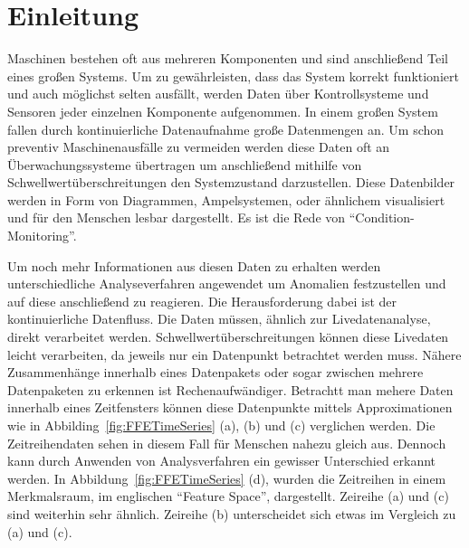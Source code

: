 \section{Einleitung}\label{kap:einleitung}


Maschinen bestehen oft aus mehreren Komponenten und sind anschließend Teil eines großen Systems.
Um zu gewährleisten, dass das System korrekt funktioniert und auch möglichst selten ausfällt, werden Daten über Kontrollsysteme und Sensoren jeder einzelnen Komponente aufgenommen.
In einem großen System fallen durch kontinuierliche Datenaufnahme große Datenmengen an.
Um schon preventiv Maschinenausfälle zu vermeiden werden diese Daten oft an Überwachungssysteme übertragen um anschließend mithilfe von Schwellwertüberschreitungen den Systemzustand darzustellen.
Diese Datenbilder werden in Form von Diagrammen, Ampelsystemen, oder ähnlichem visualisiert und für den Menschen lesbar dargestellt.
Es ist die Rede von \enquote{Condition-Monitoring}.

Um noch mehr Informationen aus diesen Daten zu erhalten werden unterschiedliche Analyseverfahren angewendet um Anomalien festzustellen und auf diese anschließend zu reagieren.
Die Herausforderung dabei ist der kontinuierliche Datenfluss.
Die Daten müssen, ähnlich zur Livedatenanalyse, direkt verarbeitet werden.
Schwellwertüberschreitungen können diese Livedaten leicht verarbeiten, da jeweils nur ein Datenpunkt betrachtet werden muss.
Nähere Zusammenhänge innerhalb eines Datenpakets oder sogar zwischen mehrere Datenpaketen zu erkennen ist Rechenaufwändiger.
Betrachtt man mehere Daten innerhalb eines Zeitfensters können diese Datenpunkte mittels Approximationen wie in Abbilding\ \ref{fig:FFETimeSeries} (a), (b) und (c) verglichen werden. 
Die Zeitreihendaten sehen in diesem Fall für Menschen nahezu gleich aus. 
Dennoch kann durch Anwenden von Analysverfahren ein gewisser Unterschied erkannt werden.
In Abbildung\ \ref{fig:FFETimeSeries} (d), wurden die Zeitreihen in einem Merkmalsraum, im englischen \enquote{Feature Space}, dargestellt. 
Zeireihe (a) und (c) sind weiterhin sehr ähnlich.
Zeireihe (b) unterscheidet sich etwas im Vergleich zu (a) und (c).

